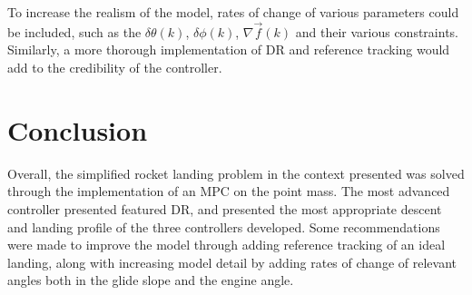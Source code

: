 \documentclass[conference, tikz]{IEEEtran}
\begin{document}
To increase the realism of the model, rates of change of various parameters could be included, such as the $\delta \theta(k)$, $\delta \phi(k)$, $\nabla \vec f(k)$ and their various constraints. Similarly, a more thorough implementation of DR and reference tracking would add to the credibility of the controller. 

\section{Conclusion}
Overall, the simplified rocket landing problem in the context presented was solved through the implementation of an MPC on the point mass. The most advanced controller presented featured DR, and presented the most appropriate descent and landing profile of the three controllers developed. Some recommendations were made to improve the model through adding reference tracking of an ideal landing, along with increasing model detail by adding rates of change of relevant angles both in the glide slope and the engine angle.  



\appendix
\end{document}
